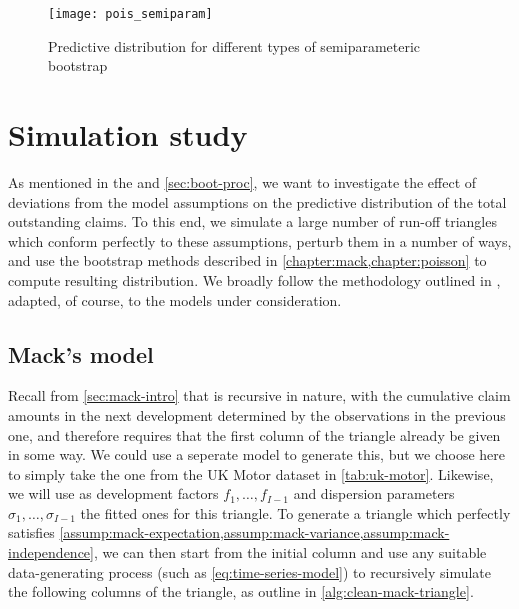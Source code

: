 \documentclass[a4paper]{book}
\begin{document}
\begin{figure}[!htb]
  \texttt{[image: pois\_semiparam]}
  \caption{Predictive distribution for different types of semiparameteric bootstrap}
  \label{fig:pred-semiparam}
\end{figure}


\chapter{Simulation study}


As mentioned in the  and \cref{sec:boot-proc}, we want to investigate the effect of deviations from the model assumptions on the predictive distribution of the total outstanding claims. To this end, we simulate a large number of run-off triangles which conform perfectly to these assumptions, perturb them in a number of ways, and use the bootstrap methods described in \cref{chapter:mack,chapter:poisson} to compute resulting distribution. We broadly follow the methodology outlined in \cite{schiegl}, adapted, of course, to the models under consideration.

\section{Mack's model} \label{sec:mack-sim}

Recall from \cref{sec:mack-intro} that  is recursive in nature, with the cumulative claim amounts in the next development determined by the observations in the previous one, and therefore requires that the first column of the triangle already be given in some way. We could use a seperate model to generate this, but we choose here to simply take the one from the UK Motor dataset in \cref{tab:uk-motor}. Likewise, we will use as development factors $f_1, \dots, f_{I - 1}$ and dispersion parameters $\sigma_1, \dots, \sigma_{I - 1}$ the fitted ones for this triangle. To generate a triangle which perfectly satisfies \cref{assump:mack-expectation,assump:mack-variance,assump:mack-independence}, we can then start from the initial column and use any suitable data-generating process (such as \cref{eq:time-series-model}) to recursively simulate the following columns of the triangle, as outline in \cref{alg:clean-mack-triangle}.
\end{document}
